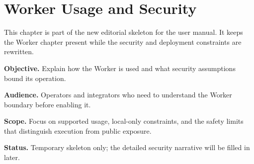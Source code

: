 \chapter{Worker Usage and Security}
\label{chap:worker-usage-and-security}

This chapter is part of the new editorial skeleton for the user manual. It keeps the Worker chapter present while the security and deployment constraints are rewritten.

\noindent\textbf{Objective.} Explain how the Worker is used and what security assumptions bound its operation.

\noindent\textbf{Audience.} Operators and integrators who need to understand the Worker boundary before enabling it.

\noindent\textbf{Scope.} Focus on supported usage, local-only constraints, and the safety limits that distinguish execution from public exposure.

\noindent\textbf{Status.} Temporary skeleton only; the detailed security narrative will be filled in later.
